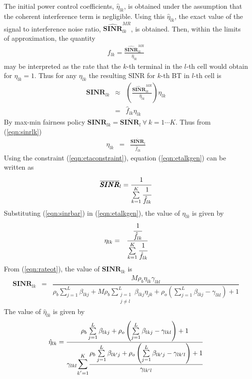 \documentclass[10pt, a4paper, twoside,fleqn]{article}
\begin{document}
    The initial power control coefficients, $\hat \eta_{lk}$, is obtained under the assumption that the coherent interference term is negligible. Using this $\hat \eta_{lk}$, the exact value of the signal to interference noise ratio, $\pmb{\widehat{SINR}}_{lk}^{MR}$, is obtained. Then, within the limits of approximation, the quantity
\begin{eqnarray}\label{eqn:flk}
\hat f_{lk} = \frac{\pmb{\widehat{SINR}}_{lk}^{MR}}{\hat \eta_{lk}} 
\end{eqnarray}
may be interpreted as the rate that the $k$-th terminal in the $l$-th cell would obtain for $\eta_{lk}=1$. Thus for any $\eta_{lk}$ the resulting SINR for $k$-th BT in $l$-th cell is
\begin{eqnarray}\label{eqn:sinrlk}
\pmb{SINR}_{lk} &\approx & \left(\frac{\pmb{\widehat{SINR}}_{lk}^{MR}}{\hat \eta_{lk}}\right)\eta_{lk} \nonumber \\
                  &=& \hat f_{lk}\eta_{lk}   
\end{eqnarray}
By max-min fairness policy $\pmb{SINR}_{lk} = \overline{\pmb{SINR}}_{l} \ \forall \ k=1 \cdots K$. Thus from (\ref{eqn:sinrlk})
\begin{eqnarray}\label{eqn:etalkgen}
    \eta_{lk} &=& \frac{\overline{\pmb{SINR}}_{l}}{\hat f_{lk}}
\end{eqnarray}
Using the constraint (\ref{eqn:etaconstraint}), equation (\ref{eqn:etalkgen}) can be written as
\begin{eqnarray}\label{eqn:sinrbar}
\overline{\pmb{SINR}}_{l} = \cfrac{1}{\sum\limits_{k=1}^K\cfrac{1}{\hat f_{lk}}}
\end{eqnarray}
 Substituting (\ref{eqn:sinrbar}) in (\ref{eqn:etalkgen}), the value of $\eta_{lk}$ is given by
\begin{eqnarray}\label{eqn:etalkgen}
\eta_{lk} &=& \cfrac{\cfrac{1}{\hat f_{lk}}}{\sum\limits_{k=1}^K\cfrac{1}{\hat f_{lk}}}
\end{eqnarray}
From (\ref{eqn:rateot}), the value of $\pmb{SINR}_{lk}$ is
\begin{eqnarray}\label{eqn:sinrlkbt}
\pmb{SINR}_{lk} &=& \dfrac{M\rho_b\eta_{lk}\gamma_{lkl}}{ \rho_b\sum\limits_{j=1}^{L}\beta_{lkj}+M\rho_b\sum\limits_{\substack{j=1 \\ j \neq l}}^{L}\beta_{lkj}\eta_{jk} +\rho_o\left(\sum\limits_{j=1}^{L}\beta_{lkj} -\gamma_{lkl}\right)+1}
\end{eqnarray}
The value of $\hat \eta_{lk}$ is given by
\begin{eqnarray}\label{eqn:etahatbt}
\hat \eta_{lk} = \dfrac{\rho_b\sum\limits_{j=1}^{L}\beta_{lkj}+\rho_o\left(\sum\limits_{j=1}^{L}\beta_{lkj} -\gamma_{lkl}\right)+1}
                       {\gamma_{lkl}\mathlarger{\mathlarger{\sum}}\limits_{k'=1}^{K}\cfrac{\rho_b\sum\limits_{j=1}^{L}\beta_{lk'j}+\rho_o\left(\sum\limits_{j=1}^{L}\beta_{lk'j} -\gamma_{lk'l}\right)+1}{\gamma_{lk'l}}}
\end{eqnarray}
\end{document}
